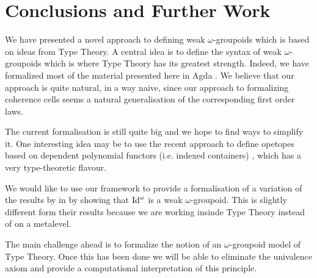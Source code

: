 \section{Conclusions and Further Work}
\label{sec:conclusions}

We have presented a novel approach to defining weak $\omega$-groupoids
which is based on ideas from Type Theory. A central idea is to define
the syntax of weak $\omega$-groupoids which is where Type Theory has
its greatest strength. Indeed, we have formalized most of the material
presented here in Agda \cite{agda}.  We believe that our approach is
quite natural, in a way naive, since our approach to formalizing coherence
cells seems a natural generalisation of the corresponding first
order laws.

The current formalisation is still
quite big and we hope to find ways to simplify it. One interesting
idea may be to use the recent approach to define opetopes based on
dependent polynomial functors (i.e. indexed containers) \cite{opetopes},
which has a very type-theoretic flavour.  

We would like to use our framework to provide a formalisation of a
variation of the results by in
\cite{lumsdaine10:weak-o-categories,berg08:types-are} by showing that
$\mathrm{Id}^\omega$ is a weak $\omega$-groupoid. This is slightly different form
their results because we are working insinde Type Theory instead of on
a metalevel.

The main challenge ahead is to formalize the notion of an
$\omega$-groupoid model of Type Theory. Once this has been done we
will be able to eliminate the univalence axiom and provide a
computational interpretation of this principle.



